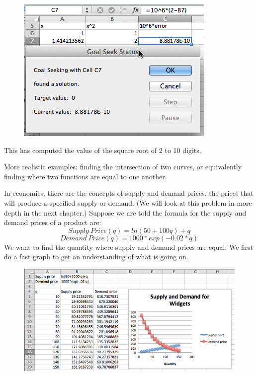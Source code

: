 \documentclass[10pt,]{book}
\theoremstyle{plain}
\theoremstyle{definition}
\theoremstyle{definition}
\begin{document}
  \leavevmode%
\begin{figure}
\centering
\includegraphics[width=0.8\linewidth]{images/sec1-6-5.png}
\end{figure}
 

%
\par

This has computed the value of the square root of 2 to 10 digits.

%
\par

More realistic examples: finding the intersection of two curves, or equivalently finding where two functions are equal to one another.

%
\par

In economics, there are the concepts of supply and demand prices, the prices that will produce a specified supply or demand.  (We will look at this problem in more depth in the next chapter.)  Suppose we are told the formula for the supply and demand prices of a product are:
\begin{equation*}Supply\  Price (q) = ln(50 + 100 q) + q\end{equation*}
\begin{equation*}Demand\  Price (q) = 1000*exp(-0.02*q)\end{equation*}
We want to find the quantity where supply and demand prices are equal.  We first do a fast graph to get an understanding of what is going on.

  \leavevmode%
\begin{figure}
\centering
\includegraphics[width=0.8\linewidth]{images/sec1-6-6.png}
\end{figure}
 
\end{document}
